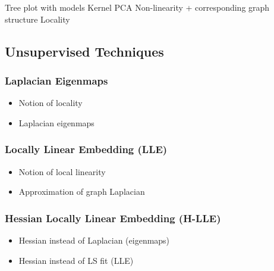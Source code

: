 Tree plot with models
Kernel PCA
Non-linearity + corresponding graph structure
Locality


\subsection{Unsupervised Techniques}
\label{techniques}


\subsubsection{Laplacian Eigenmaps}
\label{laplace}

\begin{itemize}
  \item Notion of locality
  \item Laplacian eigenmaps
\end{itemize}


\subsubsection{Locally Linear Embedding (LLE)}
\label{lle}

\begin{itemize}
  \item Notion of local linearity
  \item Approximation of graph Laplacian
\end{itemize}



\subsubsection{Hessian Locally Linear Embedding (H-LLE)}
\label{hlle}

\begin{itemize}
  \item Hessian instead of Laplacian (eigenmaps)
  \item Hessian instead of LS fit (LLE)
\end{itemize}
